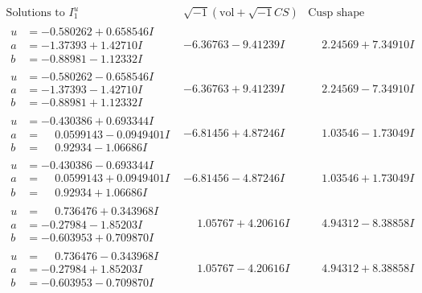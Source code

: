 \documentclass[1p]{elsarticle_modified}
\theoremstyle{definition}
\newcommand{\I}{\sqrt{-1}}
\begin{document}
$$\begin{array}{c|c|c}  
\text{Solutions to }I^u_{1}& \I (\text{vol} + \sqrt{-1}CS) & \text{Cusp shape}\\
 \hline 
\begin{aligned}
u &= -0.580262 + 0.658546 I \\
a &= -1.37393 + 1.42710 I \\
b &= -0.88981 - 1.12332 I\end{aligned}
 & -6.36763 - 9.41239 I & \phantom{-}2.24569 + 7.34910 I \\ \hline\begin{aligned}
u &= -0.580262 - 0.658546 I \\
a &= -1.37393 - 1.42710 I \\
b &= -0.88981 + 1.12332 I\end{aligned}
 & -6.36763 + 9.41239 I & \phantom{-}2.24569 - 7.34910 I \\ \hline\begin{aligned}
u &= -0.430386 + 0.693344 I \\
a &= \phantom{-}0.0599143 - 0.0949401 I \\
b &= \phantom{-}0.92934 - 1.06686 I\end{aligned}
 & -6.81456 + 4.87246 I & \phantom{-}1.03546 - 1.73049 I \\ \hline\begin{aligned}
u &= -0.430386 - 0.693344 I \\
a &= \phantom{-}0.0599143 + 0.0949401 I \\
b &= \phantom{-}0.92934 + 1.06686 I\end{aligned}
 & -6.81456 - 4.87246 I & \phantom{-}1.03546 + 1.73049 I \\ \hline\begin{aligned}
u &= \phantom{-}0.736476 + 0.343968 I \\
a &= -0.27984 - 1.85203 I \\
b &= -0.603953 + 0.709870 I\end{aligned}
 & \phantom{-}1.05767 + 4.20616 I & \phantom{-}4.94312 - 8.38858 I \\ \hline\begin{aligned}
u &= \phantom{-}0.736476 - 0.343968 I \\
a &= -0.27984 + 1.85203 I \\
b &= -0.603953 - 0.709870 I\end{aligned}
 & \phantom{-}1.05767 - 4.20616 I & \phantom{-}4.94312 + 8.38858 I \\ \hline\begin{aligned}

\end{aligned}
\end{array}$$
\end{document}
